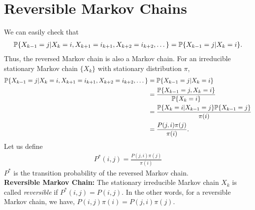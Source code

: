 \documentclass[all-lectures.tex]{subfiles}
\begin{document}
\section{Reversible Markov Chains}
We can easily check that 
\begin{align*}
\P\{X_{k-1} = j| X_k = i, X_{k+1} = i_{k+1}, X_{k+2} = i_{k+2}, \dots\} = \P\{X_{k-1} = j|X_k = i\}.
\end{align*}
Thus, the reversed Markov chain is also a Markov chain. For an irreducible  stationary Markov chain $\{X_k\}$ with stationary distribution $\pi$,
\begin{align*}
\P\{X_{k-1} = j| X_k = i,X_{k+1} = i_{k+1},X_{k+2} = i_{k+2},\dots\} &= \P\{X_{k-1} = j| X_k = i\} \\
&=  \frac{\P\{X_{k-1} = j, X_k = i\}}{\P\{ X_k = i\}} \\
&=  \frac{\P\{ X_k = i|X_{k-1} = j\}\P\{ X_{k-1} = j\}}{\pi(i)} \\
&=  \frac{P(j,i)\pi(j)}{\pi(i)}.
\end{align*}
Let us define 
\begin{align*}
P^*(i,j)=\frac{P(j,i)\pi(j)}{\pi(i)}
\end{align*}
$P^*$ is the transition probability of the reversed Markov chain. \\
\indent \textbf{Reversible Markov Chain:} The stationary irreducible Markov chain $X_k$ is called \textit{reversible }if $P^*(i,j) = P(i,j)$. In the other words, for a reversible  Markov chain, we have, $P(i,j)\pi(i) = P(j,i)\pi(j)$.
\end{document}
